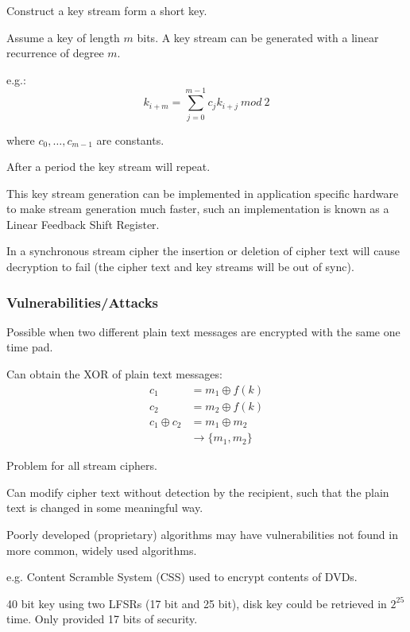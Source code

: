 \documentclass[a4paper]{article}
\begin{document}
Construct a key stream form a short key.

Assume a key of length $m$ bits. A key stream can be generated with a linear
recurrence of degree $m$.

e.g.:
\[
  k_{i+m} = \sum^{m-1}_{j=0} c_{j}k_{i+j} \: mod \: 2
\]

where $c_{0}, \ldots, c_{m-1}$ are constants.

After a period the key stream will repeat.

This key stream generation can be implemented in application specific hardware
to make stream generation much faster, such an implementation is known as a
Linear Feedback Shift Register.

In a synchronous stream cipher the insertion or deletion of cipher text will
cause decryption to fail (the cipher text and key streams will be out of sync).

\subsubsection{Vulnerabilities/Attacks}


Possible when two different plain text messages are encrypted with the same one
time pad.

Can obtain the XOR of plain text messages:
\begin{align*}
               c_{1} &= m_{1} \oplus f(k) \\
               c_{2} &= m_{2} \oplus f(k) \\
  c_{1} \oplus c_{2} &= m_{1} \oplus m_{2} \\
                     &\rightarrow \{m_{1}, m_{2}\}
\end{align*}


Problem for all stream ciphers.

Can modify cipher text without detection by the recipient, such that the plain
text is changed in some meaningful way.


Poorly developed (proprietary) algorithms may have vulnerabilities not found in
more common, widely used algorithms.

e.g. Content Scramble System (CSS) used to encrypt contents of DVDs.

40 bit key using two LFSRs (17 bit and 25 bit), disk key could be retrieved in
$2^{25}$ time. Only provided 17 bits of security.
\end{document}

